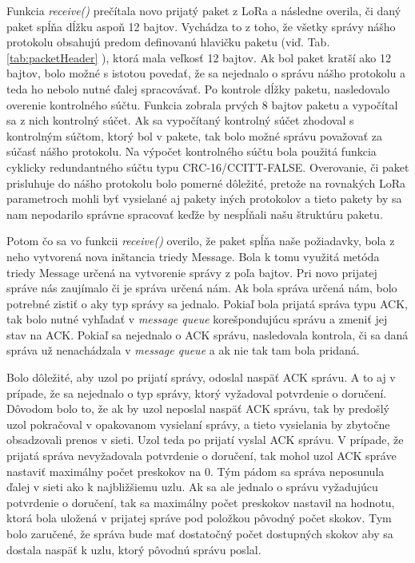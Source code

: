 \documentclass[slovak,master]{diploma}
\begin{document}
Funkcia \emph{receive()} prečítala novo prijatý paket z LoRa a následne overila, či daný paket spĺňa dĺžku aspoň 12 bajtov. Vychádza to z toho, že všetky správy nášho protokolu obsahujú predom definovanú 
hlavičku paketu (viď. Tab. \ref{tab:packetHeader} ), ktorá mala veľkosť 12 bajtov. Ak bol paket kratší ako 12 bajtov, bolo možné s istotou povedať, že sa nejednalo o správu nášho protokolu a teda ho nebolo 
nutné ďalej spracovávať. Po kontrole dĺžky paketu, nasledovalo overenie kontrolného súčtu. Funkcia zobrala prvých 8 bajtov paketu a vypočítal sa z nich kontrolný súčet. 
Ak sa vypočítaný kontrolný súčet zhodoval s kontrolným súčtom, ktorý bol v pakete, tak bolo možné správu považovať za 
súčasť nášho protokolu. Na výpočet kontrolného súčtu bola použitá funkcia cyklicky redundantného súčtu typu CRC-16/CCITT-FALSE. Overovanie, či paket prisluhuje do nášho protokolu bolo pomerné dôležité, 
pretože na rovnakých LoRa parametroch mohli byť vysielané aj pakety iných protokolov a tieto pakety by sa nam nepodarilo správne spracovať keďže by nespĺňali našu štruktúru paketu.

Potom čo sa vo funkcii \emph{receive()} overilo, že paket spĺňa naše požiadavky, bola z neho vytvorená nova inštancia triedy Message. Bola k tomu využitá metóda triedy Message určená na vytvorenie správy z 
poľa bajtov. Pri novo prijatej správe nás zaujímalo či je správa určená nám. Ak bola správa určená nám, bolo potrebné zistiť o aky typ správy sa jednalo. Pokiaľ bola prijatá správa typu ACK, tak bolo 
nutné vyhľadať v \emph{message queue} korešpondujúcu správu a zmeniť jej stav na ACK. Pokiaľ sa nejednalo o ACK správu, nasledovala kontrola, či sa daná správa už nenachádzala v \emph{message queue} a ak nie tak tam bola pridaná.

Bolo dôležité, aby uzol po prijatí správy, odoslal naspäť ACK správu. A to aj v prípade, že sa nejednalo o typ správy, ktorý vyžadoval potvrdenie o doručení. Dôvodom bolo to, že ak by 
uzol neposlal naspäť ACK správu, tak by predošlý uzol pokračoval v opakovanom vysielaní správy, a tieto vysielania by zbytočne obsadzovali prenos v sieti. Uzol teda po prijatí vyslal ACK správu. 
V prípade, že prijatá správa nevyžadovala potvrdenie o doručení, tak mohol uzol ACK správe nastaviť maximálny počet preskokov na 0. 
Tým pádom sa správa neposunula ďalej v sieti ako k najbližšiemu uzlu. Ak sa ale jednalo o správu vyžadujúcu potvrdenie o doručení, tak sa maximálny počet preskokov nastavil na 
hodnotu, ktorá bola uložená v prijatej správe pod položkou pôvodný počet skokov. 
Tym bolo zaručené, že správa bude mať dostatočný počet dostupných skokov aby sa dostala naspäť k uzlu, ktorý pôvodnú správu poslal.
\end{document}
